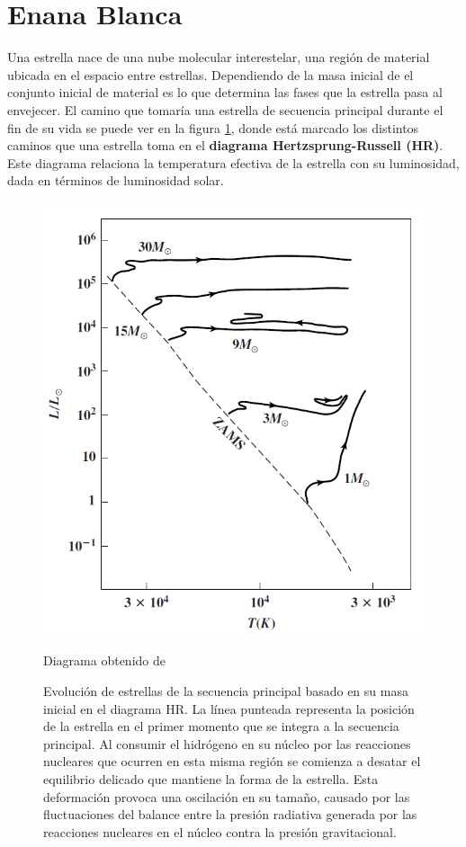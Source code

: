 \section{Enana Blanca}\label{intro:sec:EnanaBlanca}

Una estrella nace de una nube molecular interestelar, una región de material
ubicada en el espacio entre estrellas. Dependiendo de la masa inicial de el
conjunto inicial de material es lo que determina las fases que la estrella pasa
al envejecer. El camino que tomaría una estrella de secuencia principal durante
el fin de su vida se puede ver en la figura \ref{evolucionMSEstrella}, donde
está marcado los distintos caminos que una estrella toma en el \textbf{diagrama
Hertzsprung-Russell (HR)}. Este diagrama relaciona la temperatura efectiva de la
estrella con su luminosidad, dada en términos de luminosidad solar.

\begin{figure}[!ht]
	\centering
	\includegraphics[scale=0.5]{Introduccion/Figures/Figura Evolucion_MS_Astronomy_Physical_Perspective.png}
	\caption{Evolución de estrellas de la secuencia principal basado en su masa
	inicial en el diagrama HR. La línea punteada representa la posición de la
	estrella en el primer momento que se integra a la secuencia principal. Al
	consumir el hidrógeno en su núcleo por las reacciones nucleares que ocurren
	en esta misma región se comienza a desatar el equilibrio delicado que
	mantiene la forma de la estrella. Esta deformación provoca una oscilación en
	su tamaño, causado por las fluctuaciones del balance entre la presión
	radiativa generada por las reacciones nucleares en el núcleo contra la
	presión gravitacional.}
	Diagrama obtenido de \citet{astronomyPhysicalPerspective_stellarOldAgeChapter}
	\label{evolucionMSEstrella}
\end{figure}

